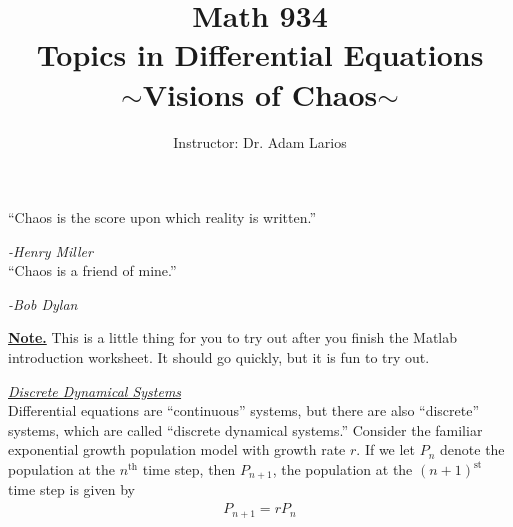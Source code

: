 \documentclass{amsart}
\theoremstyle{plain}
\theoremstyle{definition}
\theoremstyle{remark}
\numberwithin{equation}{section} %
\numberwithin{figure}{section}   %
\begin{document}
\title{Math 934\\Topics in Differential Equations\\$\sim$Visions of Chaos$\sim$}
\date{} 
\author{Instructor: Dr. Adam Larios}
\maketitle


\thispagestyle{empty}

 
 




\noindent
``Chaos is the score upon which reality is written.''
 \par\emph{-Henry Miller}
 \\
 
 \noindent
 ``Chaos is a friend of mine.''  \par\emph{-Bob Dylan}
% 

% 

\bigskip

\noindent\underline{\textbf{Note.}} This is a little thing for you to try out after you finish the Matlab introduction worksheet.  It should go quickly, but it is fun to try out.

\noindent\underline{\textit{Discrete Dynamical Systems}}\\
Differential equations are ``continuous'' systems, but there are also ``discrete'' systems, which are called ``discrete dynamical systems.''  Consider the familiar exponential growth population model with growth rate $r$.  If we let $P_n$ denote the population at the $n^{\text{th}}$ time step, then $P_{n+1}$, the population at the $(n+1)^{\text{st}}$ time step is given by
\begin{align*}
   P_{n+1} = rP_n
\end{align*}
\end{document}

